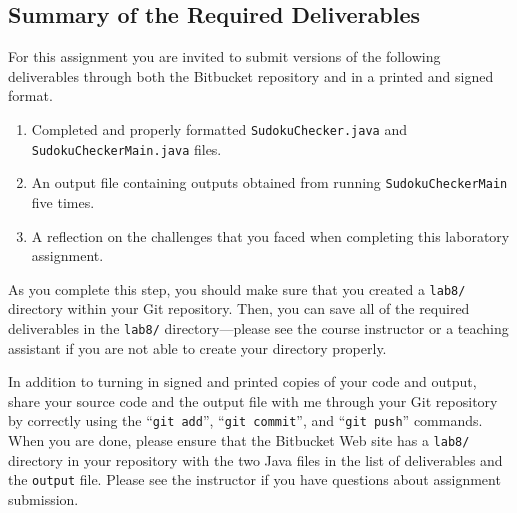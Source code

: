 \subsection*{Summary of the Required Deliverables}
\vspace{-0.05in}

For this assignment you are invited to submit versions of the following deliverables through both the Bitbucket
repository and in a printed and signed format.

\vspace{-0.1in}
\begin{enumerate}
    \setlength{\itemsep}{0pt}
  \item Completed and properly formatted {\tt SudokuChecker.java} and {\tt SudokuCheckerMain.java} files.

  \item An output file containing outputs obtained from running {\tt SudokuCheckerMain} five times.

  \item A reflection on the challenges that you faced when completing this laboratory assignment.

\end{enumerate}
\vspace{-0.075in}

\noindent As you complete this step, you should make sure that you created a {\tt lab8/} directory within your Git
repository.  Then, you can save all of the required deliverables in the {\tt lab8/} directory---please see the course
instructor or a teaching assistant if you are not able to create your directory properly.

In addition to turning in signed and printed copies of your code and output, share your source code and the output
file with me through your Git repository by correctly using the ``{\tt git add}'', ``{\tt git commit}'', and ``{\tt git
  push}'' commands. When you are done, please ensure that the Bitbucket Web site has a {\tt lab8/} directory in your
repository with the two Java files in the list of deliverables and the {\tt output} file. Please see the instructor
if you have questions about assignment submission.


